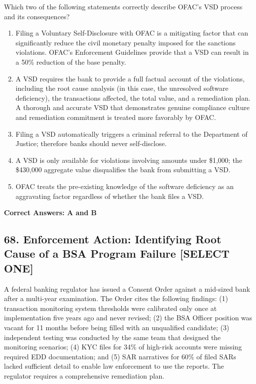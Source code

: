 \documentclass[11pt,a4paper]{article}
\begin{document}
	Which two of the following statements correctly describe OFAC's VSD process and its consequences?
	
	\begin{enumerate}[label=\Alph*.]
		\item Filing a Voluntary Self-Disclosure with OFAC is a mitigating factor that can significantly reduce the civil monetary penalty imposed for the sanctions violations. OFAC's Enforcement Guidelines provide that a VSD can result in a 50\% reduction of the base penalty.
		\item A VSD requires the bank to provide a full factual account of the violations, including the root cause analysis (in this case, the unresolved software deficiency), the transactions affected, the total value, and a remediation plan. A thorough and accurate VSD that demonstrates genuine compliance culture and remediation commitment is treated more favorably by OFAC.
		\item Filing a VSD automatically triggers a criminal referral to the Department of Justice; therefore banks should never self-disclose.
		\item A VSD is only available for violations involving amounts under \$1,000; the \$430,000 aggregate value disqualifies the bank from submitting a VSD.
		\item OFAC treats the pre-existing knowledge of the software deficiency as an aggravating factor regardless of whether the bank files a VSD.
	\end{enumerate}
	\textbf{Correct Answers: A and B}
	
	\subsection{68. Enforcement Action: Identifying Root Cause of a BSA Program Failure \textnormal{[SELECT ONE]}}
	
	A federal banking regulator has issued a Consent Order against a mid-sized bank after a multi-year examination. The Order cites the following findings: (1) transaction monitoring system thresholds were calibrated only once at implementation five years ago and never revised; (2) the BSA Officer position was vacant for 11 months before being filled with an unqualified candidate; (3) independent testing was conducted by the same team that designed the monitoring scenarios; (4) KYC files for 34\% of high-risk accounts were missing required EDD documentation; and (5) SAR narratives for 60\% of filed SARs lacked sufficient detail to enable law enforcement to use the reports. The regulator requires a comprehensive remediation plan.
	
\end{document}
